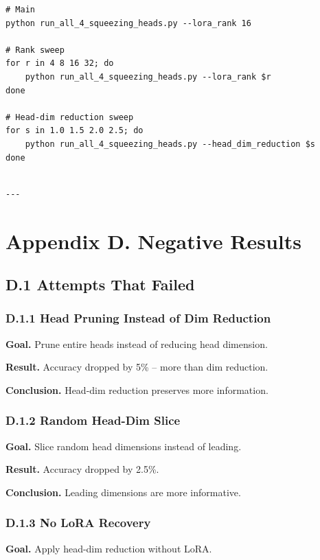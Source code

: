 \begin{lstlisting}
# Main
python run_all_4_squeezing_heads.py --lora_rank 16

# Rank sweep
for r in 4 8 16 32; do
    python run_all_4_squeezing_heads.py --lora_rank $r
done

# Head-dim reduction sweep
for s in 1.0 1.5 2.0 2.5; do
    python run_all_4_squeezing_heads.py --head_dim_reduction $s
done
\end{lstlisting}
\begin{lstlisting}

---
\end{lstlisting}


\section{Appendix D. Negative Results}

\subsection{D.1 Attempts That Failed}

\subsubsection{D.1.1 Head Pruning Instead of Dim Reduction}

\textbf{Goal.} Prune entire heads instead of reducing head dimension.

\textbf{Result.} Accuracy dropped by 5\% -- more than dim reduction.

\textbf{Conclusion.} Head-dim reduction preserves more information.

\subsubsection{D.1.2 Random Head-Dim Slice}

\textbf{Goal.} Slice random head dimensions instead of leading.

\textbf{Result.} Accuracy dropped by 2.5\%.

\textbf{Conclusion.} Leading dimensions are more informative.

\subsubsection{D.1.3 No LoRA Recovery}

\textbf{Goal.} Apply head-dim reduction without LoRA.

